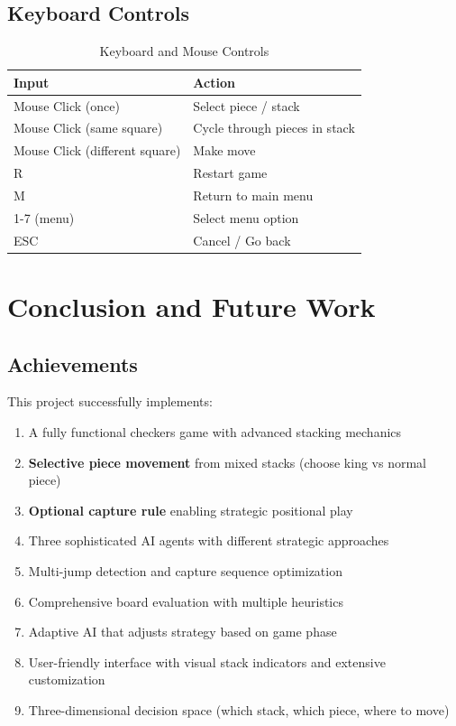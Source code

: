 \documentclass[12pt,a4paper]{article}
\begin{document}
\subsection{Keyboard Controls}

\begin{table}[H]
\centering
\caption{Keyboard and Mouse Controls}
\begin{tabular}{@{}ll@{}}
\toprule
\textbf{Input} & \textbf{Action} \\
\midrule
Mouse Click (once) & Select piece / stack \\
Mouse Click (same square) & Cycle through pieces in stack \\
Mouse Click (different square) & Make move \\
R & Restart game \\
M & Return to main menu \\
1-7 (menu) & Select menu option \\
ESC & Cancel / Go back \\
\bottomrule
\end{tabular}
\end{table}

\section{Conclusion and Future Work}

\subsection{Achievements}

This project successfully implements:
\begin{enumerate}
    \item A fully functional checkers game with advanced stacking mechanics
    \item \textbf{Selective piece movement} from mixed stacks (choose king vs normal piece)
    \item \textbf{Optional capture rule} enabling strategic positional play
    \item Three sophisticated AI agents with different strategic approaches
    \item Multi-jump detection and capture sequence optimization
    \item Comprehensive board evaluation with multiple heuristics
    \item Adaptive AI that adjusts strategy based on game phase
    \item User-friendly interface with visual stack indicators and extensive customization
    \item Three-dimensional decision space (which stack, which piece, where to move)
\end{enumerate}
\end{document}
